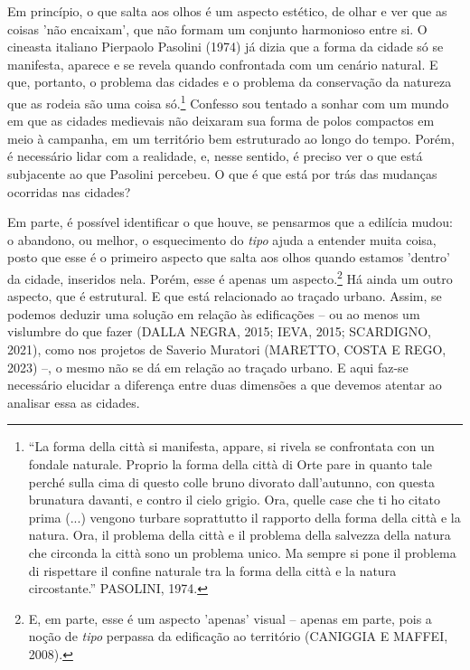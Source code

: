 \documentclass[]{report}
\begin{document}
	Em princípio, o que salta aos olhos é um aspecto estético, de olhar e ver que as coisas 'não encaixam', que não formam um conjunto harmonioso entre si. O cineasta italiano Pierpaolo Pasolini (1974) já dizia que a forma da cidade só se manifesta, aparece e se revela quando confrontada com um cenário natural. E que, portanto, o problema das cidades e o problema da conservação da natureza que as rodeia são uma coisa só.\footnote[4]{“La forma della città si manifesta, appare, si rivela se confrontata con un fondale naturale. Proprio la forma della città di Orte pare in quanto tale perché sulla cima di questo colle bruno divorato dall’autunno, con questa brunatura davanti, e contro il cielo grigio. Ora, quelle case che ti ho citato prima (...) vengono turbare soprattutto il rapporto della forma della città e la natura. Ora, il problema della città e il problema della salvezza della natura che circonda la città sono un problema unico. Ma sempre si pone il problema di rispettare il confine naturale tra la forma della città e la natura circostante.” PASOLINI, 1974.} Confesso sou tentado a sonhar com um mundo em que as cidades medievais não deixaram sua forma de polos compactos em meio à campanha, em um território bem estruturado ao longo do tempo. Porém, é necessário lidar com a realidade, e, nesse sentido, é preciso ver o que está subjacente ao que Pasolini percebeu. O que é que está por trás das mudanças ocorridas nas cidades? 
	
	Em parte, é possível identificar o que houve, se pensarmos que a edilícia mudou: o abandono, ou melhor, o esquecimento do \textit{tipo} ajuda a entender muita coisa, posto que esse é o primeiro aspecto que salta aos olhos quando estamos 'dentro' da cidade, inseridos nela. Porém, esse é apenas um aspecto.\footnote[5]{E, em parte, esse é um aspecto 'apenas' visual – apenas em parte, pois a noção de \textit{tipo} perpassa da edificação ao território (CANIGGIA E MAFFEI, 2008). } Há ainda um outro aspecto, que é estrutural. E que está relacionado ao traçado urbano. Assim, se podemos deduzir uma solução em relação às edificações – ou ao menos um vislumbre do que fazer (DALLA NEGRA, 2015; IEVA, 2015; SCARDIGNO, 2021), como nos projetos de Saverio Muratori (MARETTO, COSTA E REGO, 2023) –, o mesmo não se dá em relação ao traçado urbano. E aqui faz-se necessário elucidar a diferença entre duas dimensões a que devemos atentar ao analisar essa as cidades. 
	
\end{document}

